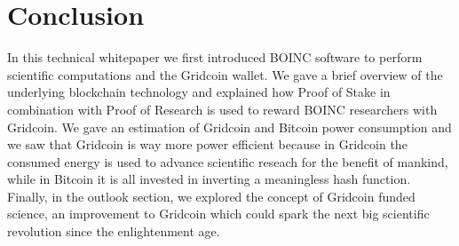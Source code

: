 \section{Conclusion}

In this technical whitepaper we first introduced BOINC software to perform scientific computations and the Gridcoin wallet. We gave a brief overview of the underlying blockchain technology and explained how Proof of Stake in combination with Proof of Research is used to reward BOINC researchers with Gridcoin. We gave an estimation of Gridcoin and Bitcoin power consumption and we saw that Gridcoin is way more power efficient because in Gridcoin the consumed energy is used to advance scientific reseach for the benefit of mankind, while in Bitcoin it is all invested in inverting a meaningless hash function. Finally, in the outlook section, we explored the concept of Gridcoin funded science, an improvement to Gridcoin which could spark the next big scientific revolution since the enlightenment age.\\


